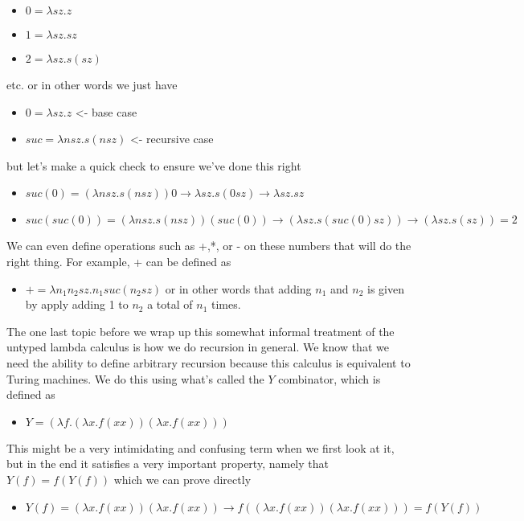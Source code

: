 \documentclass[11pt]{article}
\begin{document}
\begin{itemize}
\item $0 = \lambda s z. z$
\item $1 = \lambda s z. s z$
\item $2 = \lambda s z. s (s z)$
\end{itemize}
etc.
or in other words we just have
\begin{itemize}
\item $0 = \lambda s z. z$ <- base case
\item $suc = \lambda n s z. s (n s z)$ <- recursive case
\end{itemize}
but let's make a quick check to ensure we've done this right
\begin{itemize}
\item $suc(0) = (\lambda n s z. s (n s z)) 0 \to \lambda s z. s (0 s z) \to \lambda s z. s z$
\item $suc(suc(0)) = (\lambda n s z. s (n s z)) (suc(0)) \to (\lambda s z. s (suc(0) s z)) \to (\lambda s z. s (s z)) = 2$
\end{itemize}

We can even define operations such as +,*, or - on these numbers that will do the right thing. For example, + can be defined as

\begin{itemize}
\item $+ = \lambda n_1 n_2 s z. n_1 suc (n_2 s z)$ or in other words that adding $n_1$ and $n_2$ is given by apply adding 1 to $n_2$ a total of $n_1$ times.
\end{itemize}

The one last topic before we wrap up this somewhat informal treatment of the untyped lambda calculus is how we do recursion in general. We know that we need the ability to define arbitrary recursion because this calculus is equivalent to Turing machines. We do this using what's called the $Y$ combinator, which is defined as

\begin{itemize}
\item $Y = (\lambda f. (\lambda x. f (x x)) (\lambda x. f (x x)))$
\end{itemize}

This might be a very intimidating and confusing term when we first look at it, but in the end it satisfies a very important property, namely that $Y(f) = f(Y(f))$ which we can prove directly

\begin{itemize}
\item $Y(f) = (\lambda x. f (x x)) (\lambda x. f (x x)) \to f ((\lambda x. f (x x)) (\lambda x. f (x x))) = f(Y(f))$
\end{itemize}
\end{document}
